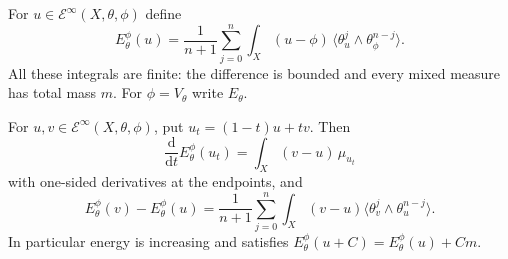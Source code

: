 \begin{definition}\label{def:relative-monge-ampere-energy}
For $u\in\mathcal E^\infty(X,\theta,\phi)$ define
\begin{equation}\label{eq:relative-energy-bounded-type}
 E_\theta^\phi(u)=\frac1{n+1}\sum_{j=0}^n
                  \int_X(u-\phi)\,
                        \langle\theta_u^j\wedge\theta_\phi^{n-j}\rangle.
\end{equation}
All these integrals are finite: the difference is bounded and every mixed measure has total mass $m$. For $\phi=V_\theta$ write $E_\theta$.
\end{definition}

\begin{proposition}\label{prop:bounded-type-energy-variation-and-cocycle}
For $u,v\in\mathcal E^\infty(X,\theta,\phi)$, put $u_t=(1-t)u+tv$. Then
\begin{equation}\label{eq:bounded-type-energy-first-variation}
 \frac{\mathrm d}{\mathrm dt}E_\theta^\phi(u_t)
                                   =\int_X(v-u)\,\mu_{u_t}
\end{equation}
with one-sided derivatives at the endpoints, and
\begin{equation}\label{eq:bounded-type-energy-cocycle}
 E_\theta^\phi(v)-E_\theta^\phi(u)
       =\frac1{n+1}\sum_{j=0}^n\int_X(v-u)
                              \langle\theta_v^j\wedge\theta_u^{n-j}\rangle.
\end{equation}
In particular energy is increasing and satisfies
$E_\theta^\phi(u+C)=E_\theta^\phi(u)+Cm$.
\end{proposition}
